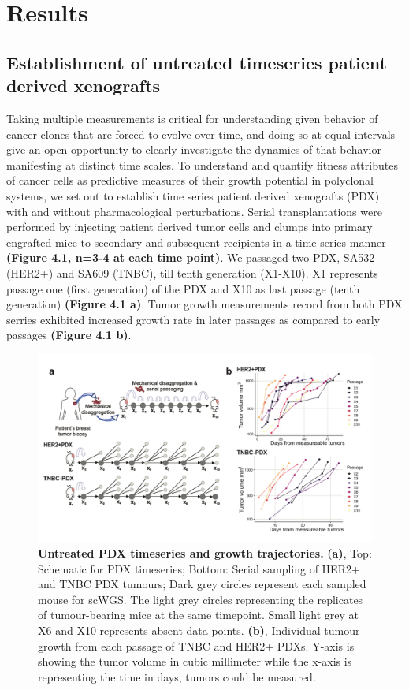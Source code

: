 \section{Results}

 
\subsection{Establishment of untreated timeseries patient derived xenografts}
Taking multiple measurements is critical for understanding  given behavior of cancer clones that are forced to evolve over time, and doing so at equal intervals give an open opportunity to clearly investigate the dynamics of that behavior manifesting at distinct time scales. 
To understand and quantify fitness attributes of cancer cells as  predictive measures of their growth potential in polyclonal systems, we set out to establish time series patient derived xenografts (PDX) with and without pharmacological perturbations.
Serial transplantations were performed by injecting patient derived tumor cells and clumps into primary engrafted mice to secondary and subsequent recipients in a time series manner \textbf{(Figure 4.1, n=3-4 at each time point)}. We passaged two PDX, SA532 (HER2+) and SA609 (TNBC), till tenth generation (X1-X10). X1 represents passage one (first generation) of the PDX and X10 as last passage (tenth generation) \textbf{(Figure 4.1 a)}. Tumor growth measurements record from both PDX serries exhibited increased growth rate in later passages as compared to early passages \textbf{(Figure 4.1 b)}.
 
 
 \begin{figure}
\centering
\includegraphics[width=\textwidth]{Figures/Untreatedgrowthcurves.pdf}
	
\caption[Untreated PDX timeseries and growth trajectories]
	{\small
	\textbf{Untreated PDX timeseries and growth trajectories.}
	    \textbf{(a)}, Top: Schematic for PDX timeseries; Bottom: Serial sampling of HER2+ and TNBC PDX tumours;
Dark grey circles represent each sampled mouse for scWGS. The light grey circles representing the replicates of tumour-bearing mice at the same timepoint. Small light grey at X6 and X10 represents absent data points.
	    \textbf{(b)}, Individual tumour growth from each passage of TNBC and HER2+ PDXs. Y-axis is showing the tumor volume in cubic millimeter while the x-axis is representing the time in days, tumors could be measured.
	}
	\label{fig:Untreated timeseries growth curves only}
\end{figure}

